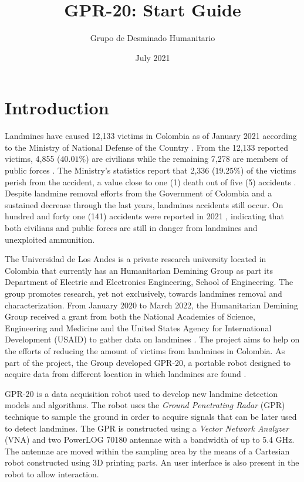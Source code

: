 \documentclass{article}
\title{GPR-20: Start Guide}
\author{Grupo de Desminado Humanitario}
\date{July 2021}
\begin{document}


\newpage
\section{Introduction}
Landmines have caused 12,133 victims in Colombia as of January 2021 according to the Ministry of National Defense of the Country \cite{MINDEFENSA_STATISTICS}. From the 12,133 reported victims, 4,855 ($40.01\%$) are civilians while the remaining 7,278 are members of public forces \cite{MINDEFENSA_STATISTICS}. The Ministry's statistics report that 2,336 ($19.25\%$) of the victims perish from the accident, a value close to one (1) death out of five (5) accidents \cite{MINDEFENSA_STATISTICS}. Despite landmine removal efforts from the Government of Colombia and a sustained decrease through the last years, landmines accidents still occur. On hundred and forty one (141) accidents were reported in 2021 \cite{MINDEFENSA_STATISTICS}, indicating that both civilians and public forces are still in danger from landmines and unexploited ammunition.

The Universidad de Los Andes is a private research university located in Colombia that currently has an Humanitarian Demining Group as part its Department of Electric and Electronics Engineering, School of Engineering. The group promotes research, yet not exclusively, towards landmines removal and characterization. From January 2020 to March 2022, the Humanitarian Demining Group received a grant from both the National Academies of Science, Engineering and Medicine and the United States Agency for International Development (USAID) to gather data on landmines \cite{PEER_LANDMINES}. The project aims to help on the efforts of reducing the amount of victims from landmines in Colombia. As part of the project, the Group developed GPR-20, a portable robot designed to acquire data from different location in which landmines are found \cite{PEER_LANDMINES}. 

GPR-20 is a data acquisition robot used to develop new landmine detection models and algorithms. The robot uses the \textit{Ground Penetrating Radar} (GPR) technique to sample the ground in order to acquire signals that can be later used to detect landmines. The GPR is constructed using a \textit{Vector Network Analyzer} (VNA) and two PowerLOG 70180 antennae with a bandwidth of up to 5.4 GHz. The antennae are moved within the sampling area by the means of a Cartesian robot constructed using 3D printing parts. An user interface is also present in the robot to allow interaction.
\end{document}
